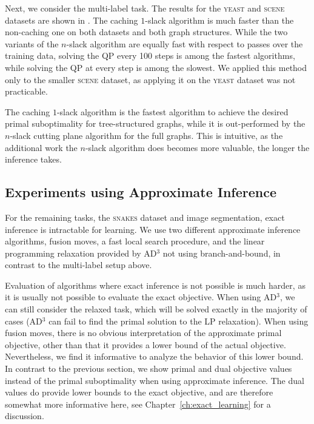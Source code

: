 Next, we consider the multi-label task.  The results for the \textsc{yeast} and \textsc{scene}
datasets are shown in . The caching $1$-slack
algorithm is much faster than the non-caching one on both datasets and both
graph structures.
While the two variants of the $n$-slack algorithm are equally fast with respect
to passes over the training data, solving the QP every 100 steps is among the
fastest algorithms, while solving the QP at every step is among the slowest.
We applied this method only to the smaller \textsc{scene} dataset, as applying it on the
\textsc{yeast} dataset was not practicable.

The caching $1$-slack algorithm is the fastest algorithm to achieve the desired
primal suboptimality for tree-structured graphs, while it is out-performed by
the $n$-slack cutting plane algorithm for the full graphs. This is intuitive,
as the additional work the $n$-slack algorithm does becomes more valuable, the
longer the inference takes. 



\subsection{Experiments using Approximate Inference}
For the remaining tasks, the \textsc{snakes} dataset and image segmentation, exact
inference is intractable for learning.
%
We use two different approximate inference algorithms, fusion moves, a fast
local search procedure, and the linear programming relaxation provided by AD$^3$
not using branch-and-bound, in contrast to the multi-label setup above.

Evaluation of algorithms where exact inference is not possible is much harder,
as it is usually not possible to evaluate the exact objective. When using AD$^3$,
we can still consider the relaxed task, which will be solved exactly in the
majority of cases (AD$^3$ can fail to find the primal solution to the LP
relaxation).
When using fusion moves, there is no obvious interpretation of the approximate
primal objective, other than that it provides a lower bound of the actual
objective. Nevertheless, we find it informative to analyze the behavior of this
lower bound. In contrast to the previous section, we show primal and dual objective
values instead of the primal suboptimality when using approximate inference.
The dual values do provide lower bounds
to the exact objective, and are therefore somewhat more informative here, see
Chapter~\ref{ch:exact_learning} for a discussion.

